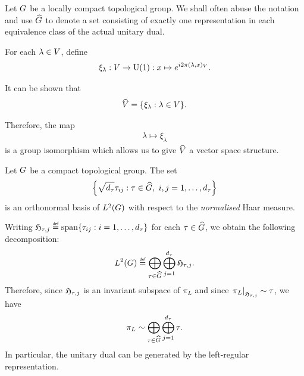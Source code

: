\begin{remark}
    Let $G$ be a locally compact topological group.
    We shall often abuse the notation and use ${\widehat{G}}$ to denote a set consisting of
    exactly one representation in each equivalence class of the actual unitary dual.
\end{remark}

\begin{example}[$\dualGroup\VectorSpace$]
    For each $\lambda \in V$,
    define
    \begin{align}
        \xi_\lambda : V \to {\mathrm{U} (1)} : x \mapsto e^{i 2 \pi {(\lambda, x)_{V}}}.
        \label{eq:elements_of_dual_of_vector_space}
    \end{align}

    It can be shown that
    \begin{align*}
        {\widehat{V}} = \{ \xi_\lambda : \lambda \in V \}.
    \end{align*}

    Therefore, the map
    \begin{align}
        \lambda \mapsto \xi_\lambda
        \label{eq:isomorphism_between_vector_space_and_its_dual_group}
    \end{align}
    is a group isomorphism which allows us to give $\dualGroup\VectorSpace$ a vector space structure.
\end{example}

\begin{theorem}
\label{theorem:Peter-Weyl_theorem}
    Let $G$ be a compact topological group.
    The set
    \begin{align*}
        \left\{
            \sqrt{\dimRep\tau} \tau_{ij} : \tau \in \dualGroup\Group,\ i, j = 1, \dots, \dimRep\tau
        \right\}
    \end{align*}
    is an orthonormal basis of ${L^{2} (G)}$ with respect to the \emph{normalised} Haar measure.

    Writing $\Hilbert{\tau}{j} \defeq \Span\{\tau_{ij} : i = 1, \dots, \dimRep\tau\}$
    for each $\tau \in {\widehat{G}}$,
    we obtain the following decomposition:
    \begin{align*}
        \Lebesgue{2}{\Group} \defeq
        \bigoplus_{\tau \in \dualGroup\Group} \bigoplus_{j = 1}^{\dimRep \tau} \Hilbert{\tau}{j}.
    \end{align*}
    Therefore,
    since $\mathfrak{H}_{\tau, j}$ is an invariant subspace of $\pi_L$
    and since $\left. \pi_L \right|_{\mathfrak{H}_{\tau, j}} \sim \tau$,
    we have
    \begin{align*}
        \pi_L \sim
        \bigoplus_{\tau \in {\widehat{G}}} \bigoplus_{j = 1}^{{d_{\tau}}} \tau.
    \end{align*}
    In particular, the unitary dual can be generated by the left-regular representation.
\end{theorem}

